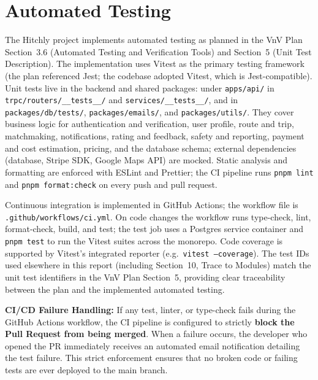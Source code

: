 \section{Automated Testing}

The Hitchly project implements automated testing as planned in the VnV Plan Section~3.6 (Automated Testing and Verification Tools) and Section~5 (Unit Test Description). The implementation uses Vitest as the primary testing framework (the plan referenced Jest; the codebase adopted Vitest, which is Jest-compatible). Unit tests live in the backend and shared packages: under \texttt{apps/api/} in \texttt{trpc/routers/\_\_tests\_\_/} and \texttt{services/\_\_tests\_\_/}, and in \texttt{packages/db/tests/}, \texttt{packages/emails/}, and \texttt{packages/utils/}. They cover business logic for authentication and verification, user profile, route and trip, matchmaking, notifications, rating and feedback, safety and reporting, payment and cost estimation, pricing, and the database schema; external dependencies (database, Stripe SDK, Google Maps API) are mocked. Static analysis and formatting are enforced with ESLint and Prettier; the CI pipeline runs \texttt{pnpm lint} and \texttt{pnpm format:check} on every push and pull request.

Continuous integration is implemented in GitHub Actions; the workflow file is \texttt{.github/workflows/ci.yml}. On code changes the workflow runs type-check, lint, format-check, build, and test; the test job uses a Postgres service container and \texttt{pnpm test} to run the Vitest suites across the monorepo. Code coverage is supported by Vitest's integrated reporter (e.g.\ \texttt{vitest --coverage}). The test IDs used elsewhere in this report (including Section~10, Trace to Modules) match the unit test identifiers in the VnV Plan Section~5, providing clear traceability between the plan and the implemented automated testing.

\textbf{CI/CD Failure Handling:} If any test, linter, or type-check fails during the GitHub Actions workflow, the CI pipeline is configured to strictly \textbf{block the Pull Request from being merged}. When a failure occurs, the developer who opened the PR immediately receives an automated email notification detailing the test failure. This strict enforcement ensures that no broken code or failing tests are ever deployed to the main branch.